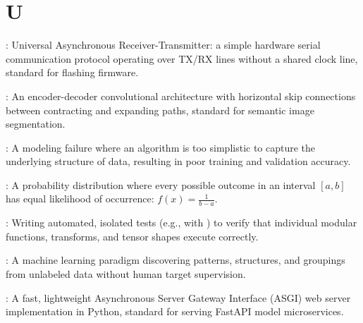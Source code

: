 \section*{U}
\begin{description}[leftmargin=!,labelwidth=4.5cm,itemsep=1.5ex]
\item[\textbf{UART}\hfill \textnormal{\sffamily\scriptsize\color{keyideablue}[IoT \& Hardware]}]: Universal Asynchronous Receiver-Transmitter: a simple hardware serial communication protocol operating over TX/RX lines without a shared clock line, standard for flashing firmware.
\item[\textbf{U-Net}\hfill \textnormal{\sffamily\scriptsize\color{keyideablue}[Deep Learning]}]: An encoder-decoder convolutional architecture with horizontal skip connections between contracting and expanding paths, standard for semantic image segmentation.
\item[\textbf{Underfitting}\hfill \textnormal{\sffamily\scriptsize\color{keyideablue}[Machine Learning]}]: A modeling failure where an algorithm is too simplistic to capture the underlying structure of data, resulting in poor training and validation accuracy.
\item[\textbf{Uniform Distribution}\hfill \textnormal{\sffamily\scriptsize\color{keyideablue}[Probability]}]: A probability distribution where every possible outcome in an interval $[a, b]$ has equal likelihood of occurrence: $f(x) = \frac{1}{b - a}$.
\item[\textbf{Unit Testing}\hfill \textnormal{\sffamily\scriptsize\color{keyideablue}[Software Engineering]}]: Writing automated, isolated tests (e.g., with ) to verify that individual modular functions, transforms, and tensor shapes execute correctly.
\item[\textbf{Unsupervised Learning}\hfill \textnormal{\sffamily\scriptsize\color{keyideablue}[Machine Learning]}]: A machine learning paradigm discovering patterns, structures, and groupings from unlabeled data without human target supervision.
\item[\textbf{Uvicorn}\hfill \textnormal{\sffamily\scriptsize\color{keyideablue}[MLOps]}]: A fast, lightweight Asynchronous Server Gateway Interface (ASGI) web server implementation in Python, standard for serving FastAPI model microservices.
\end{description}

